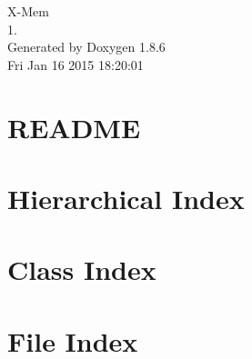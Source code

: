 \documentclass[twoside]{book}
\newcommand{\clearemptydoublepage}{%
  \newpage{\pagestyle{empty}\cleardoublepage}%
}
\begin{document}
\hypersetup{pageanchor=false}
\begin{titlepage}
\vspace*{7cm}
\begin{center}%
{\Large X-\/\-Mem \\[1ex]\large 1. }\\
\vspace*{1cm}
{\large Generated by Doxygen 1.8.6}\\
\vspace*{0.5cm}
{\small Fri Jan 16 2015 18:20:01}\\
\end{center}
\end{titlepage}
\clearemptydoublepage
\tableofcontents
\clearemptydoublepage
{}
\hypersetup{pageanchor=true}

\chapter{R\-E\-A\-D\-M\-E}
\label{md_src__r_e_a_d_m_e}
\hypertarget{md_src__r_e_a_d_m_e}{}

\chapter{Hierarchical Index}

\chapter{Class Index}

\chapter{File Index}

\end{document}
